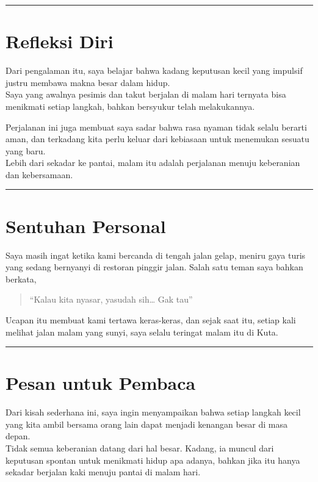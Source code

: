 \documentclass[
  letterpaper,
  DIV=11,
  numbers=noendperiod]{scrreprt}
\begin{document}
\begin{center}\rule{0.5\linewidth}{0.5pt}\end{center}

\section{Refleksi Diri}\label{refleksi-diri-1}

Dari pengalaman itu, saya belajar bahwa kadang keputusan kecil yang
impulsif justru membawa makna besar dalam hidup.\\
Saya yang awalnya pesimis dan takut berjalan di malam hari ternyata bisa
menikmati setiap langkah, bahkan bersyukur telah melakukannya.

Perjalanan ini juga membuat saya sadar bahwa rasa nyaman tidak selalu
berarti aman, dan terkadang kita perlu keluar dari kebiasaan untuk
menemukan sesuatu yang baru.\\
Lebih dari sekadar ke pantai, malam itu adalah perjalanan menuju
keberanian dan kebersamaan.

\begin{center}\rule{0.5\linewidth}{0.5pt}\end{center}

\section{Sentuhan Personal}\label{sentuhan-personal}

Saya masih ingat ketika kami bercanda di tengah jalan gelap, meniru gaya
turis yang sedang bernyanyi di restoran pinggir jalan. Salah satu teman
saya bahkan berkata,

\begin{quote}
``Kalau kita nyasar, yasudah sih\ldots{} Gak tau''
\end{quote}

Ucapan itu membuat kami tertawa keras-keras, dan sejak saat itu, setiap
kali melihat jalan malam yang sunyi, saya selalu teringat malam itu di
Kuta.

\begin{center}\rule{0.5\linewidth}{0.5pt}\end{center}

\section{Pesan untuk Pembaca}\label{pesan-untuk-pembaca}

Dari kisah sederhana ini, saya ingin menyampaikan bahwa setiap langkah
kecil yang kita ambil bersama orang lain dapat menjadi kenangan besar di
masa depan.\\
Tidak semua keberanian datang dari hal besar. Kadang, ia muncul dari
keputusan spontan untuk menikmati hidup apa adanya, bahkan jika itu
hanya sekadar berjalan kaki menuju pantai di malam hari.
\end{document}

